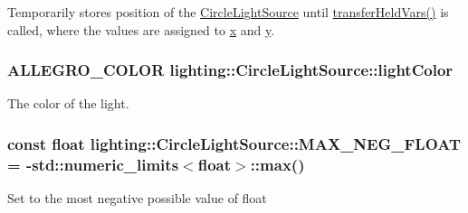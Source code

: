 Temporarily stores position of the \hyperlink{classlighting_1_1CircleLightSource}{Circle\+Light\+Source} until \hyperlink{classlighting_1_1CircleLightSource_afc39570a33c19b17fb8153be592b01e9}{transfer\+Held\+Vars()} is called, where the values are assigned to \hyperlink{classlighting_1_1CircleLightSource_afd27de5d967e2a308dadeff29d3c2883}{x} and \hyperlink{classlighting_1_1CircleLightSource_ac05186b92c9bdfcef8a27cc89f8c9b52}{y}. 

\subsubsection[{\texorpdfstring{light\+Color}{lightColor}}]{\setlength{\rightskip}{0pt plus 5cm}A\+L\+L\+E\+G\+R\+O\+\_\+\+C\+O\+L\+OR lighting\+::\+Circle\+Light\+Source\+::light\+Color\hspace{0.3cm}{\ttfamily [protected]}}\hypertarget{classlighting_1_1CircleLightSource_a39d1b9f5bfb54facf6a7e36ed0ffda82}{}\label{classlighting_1_1CircleLightSource_a39d1b9f5bfb54facf6a7e36ed0ffda82}


The color of the light. 

\subsubsection[{\texorpdfstring{M\+A\+X\+\_\+\+N\+E\+G\+\_\+\+F\+L\+O\+AT}{MAX_NEG_FLOAT}}]{\setlength{\rightskip}{0pt plus 5cm}const float lighting\+::\+Circle\+Light\+Source\+::\+M\+A\+X\+\_\+\+N\+E\+G\+\_\+\+F\+L\+O\+AT = -\/std\+::numeric\+\_\+limits$<$float$>$\+::max()\hspace{0.3cm}{\ttfamily [static]}}\hypertarget{classlighting_1_1CircleLightSource_a139a7246edba5531259b778ce0ca79b3}{}\label{classlighting_1_1CircleLightSource_a139a7246edba5531259b778ce0ca79b3}


Set to the most negative possible value of float 

